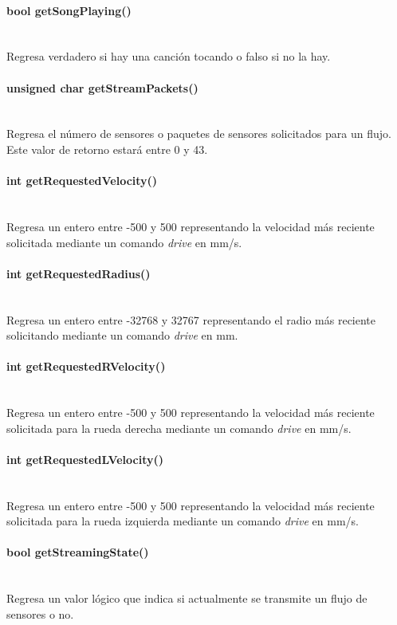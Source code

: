 \documentclass[letterpaper,openright,12pt]{book}
\begin{document}
\paragraph{bool getSongPlaying()}\mbox{}\\
Regresa verdadero si hay una canción tocando o falso si no la hay.\\
\paragraph{unsigned char getStreamPackets()}\mbox{}\\
Regresa el número de sensores o paquetes de sensores solicitados para un flujo. Este valor de retorno estará entre 0 y 43.\\
\paragraph{int getRequestedVelocity()}\mbox{}\\
Regresa un entero entre -500 y 500 representando la velocidad más reciente solicitada mediante un comando \emph{drive} en mm/s.\\
\paragraph{int getRequestedRadius()}\mbox{}\\
Regresa un entero entre -32768 y 32767 representando el radio más reciente solicitando mediante un comando \emph{drive} en mm.\\
\paragraph{int getRequestedRVelocity()}\mbox{}\\
Regresa un entero entre -500 y 500 representando la velocidad más reciente solicitada para la rueda derecha mediante un comando \emph{drive} en mm/s.\\
\paragraph{int getRequestedLVelocity()}\mbox{}\\
Regresa un entero entre -500 y 500 representando la velocidad más reciente solicitada para la rueda izquierda mediante un comando \emph{drive} en mm/s.\\
\paragraph{bool getStreamingState()}\mbox{}\\
Regresa un valor lógico que indica si actualmente se transmite un flujo de sensores o no.\\
\end{document}
